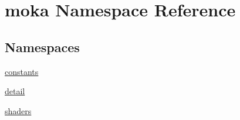 \hypertarget{namespacemoka}{}\section{moka Namespace Reference}
\label{namespacemoka}
\subsection*{Namespaces}
\begin{DoxyCompactItemize}
\item 
 \mbox{\hyperlink{namespacemoka_1_1constants}{constants}}
\item 
 \mbox{\hyperlink{namespacemoka_1_1detail}{detail}}
\item 
 \mbox{\hyperlink{namespacemoka_1_1shaders}{shaders}}
\end{DoxyCompactItemize}

